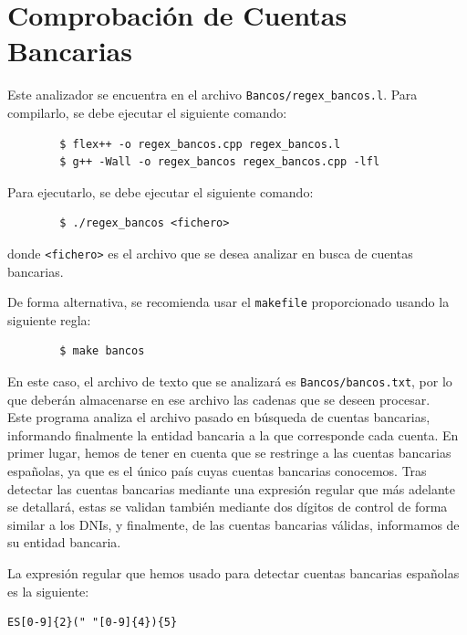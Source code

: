 \documentclass[12pt]{article}
\begin{document}
    \section{Comprobación de Cuentas Bancarias}

    Este analizador se encuentra en el archivo \verb|Bancos/regex_bancos.l|. Para compilarlo, se debe ejecutar el siguiente comando:
    \begin{verbatim}
        $ flex++ -o regex_bancos.cpp regex_bancos.l
        $ g++ -Wall -o regex_bancos regex_bancos.cpp -lfl
    \end{verbatim}

    Para ejecutarlo, se debe ejecutar el siguiente comando:
    \begin{verbatim}
        $ ./regex_bancos <fichero>
    \end{verbatim}
    donde \verb|<fichero>| es el archivo que se desea analizar en busca de cuentas bancarias.

    De forma alternativa, se recomienda usar el \verb|makefile| proporcionado usando la siguiente regla:
    \begin{verbatim}
        $ make bancos
    \end{verbatim}

    En este caso, el archivo de texto que se analizará es \verb|Bancos/bancos.txt|, por lo que deberán almacenarse en ese archivo las cadenas que se deseen procesar.\\

    Este programa analiza el archivo pasado en búsqueda de cuentas bancarias, informando finalmente la entidad bancaria a la que corresponde cada cuenta. En primer lugar, hemos de tener en cuenta que se restringe a las cuentas bancarias españolas, ya que es el único país cuyas cuentas bancarias conocemos. Tras detectar las cuentas bancarias mediante una expresión regular que más adelante se detallará, estas se validan también mediante dos dígitos de control de forma similar a los DNIs, y finalmente, de las cuentas bancarias válidas, informamos de su entidad bancaria.

    La expresión regular que hemos usado para detectar cuentas bancarias españolas es la siguiente:
    \begin{lstlisting}
ES[0-9]{2}(" "[0-9]{4}){5}
    \end{lstlisting}
\end{document}

